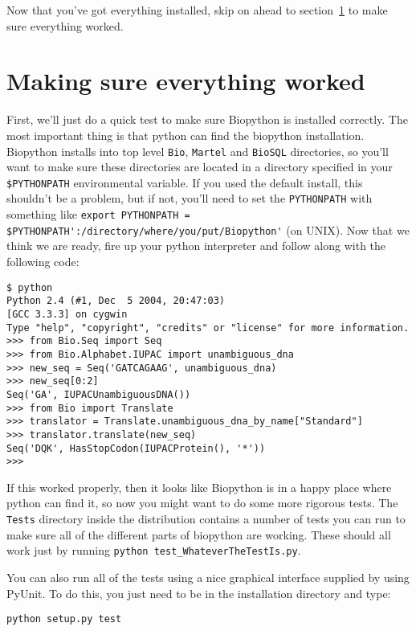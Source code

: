 \documentclass{article}
\begin{document}
Now that you've got everything installed, skip on ahead to section~\ref{sec:is_working} to make sure everything worked.

\section{Making sure everything worked}
\label{sec:is_working}

First, we'll just do a quick test to make sure Biopython is installed correctly. The most important thing is that python can find the biopython installation. Biopython installs into top level \verb|Bio|, \verb|Martel| and \verb|BioSQL| directories, so you'll want to make sure these directories are located in a directory specified 
in your\verb| $PYTHONPATH| environmental variable. If you used the default install, this shouldn't be a problem, but if not, you'll need to set the \verb|PYTHONPATH| with something like \verb|export PYTHONPATH = $PYTHONPATH':/directory/where/you/put/Biopython'| (on UNIX). Now that we think we are ready, fire up your python interpreter and follow along with the following code:

\begin{verbatim}
$ python
Python 2.4 (#1, Dec  5 2004, 20:47:03)
[GCC 3.3.3] on cygwin
Type "help", "copyright", "credits" or "license" for more information.
>>> from Bio.Seq import Seq
>>> from Bio.Alphabet.IUPAC import unambiguous_dna
>>> new_seq = Seq('GATCAGAAG', unambiguous_dna)
>>> new_seq[0:2]
Seq('GA', IUPACUnambiguousDNA())
>>> from Bio import Translate
>>> translator = Translate.unambiguous_dna_by_name["Standard"]
>>> translator.translate(new_seq)
Seq('DQK', HasStopCodon(IUPACProtein(), '*'))
>>>
\end{verbatim}

If this worked properly, then it looks like Biopython is in a happy place where python can find it, so now you might want to do some more rigorous tests. The \verb|Tests| directory inside the distribution contains a number of tests you can run to make sure all of the different parts of biopython are working. These should all work just by running \verb|python test_WhateverTheTestIs.py|. 

You can also run all of the tests using a nice graphical interface supplied by using PyUnit. To do this, you just need to be in the installation directory and type:

\begin{verbatim}
python setup.py test
\end{verbatim}
\end{document}
